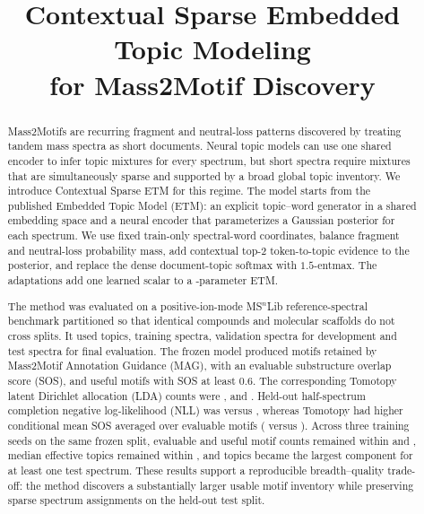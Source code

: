\documentclass[10pt,a4paper]{article}
\title{Contextual Sparse Embedded Topic Modeling\\
for Mass2Motif Discovery}
\author{}
\date{}
\begin{document}
\maketitle
\thispagestyle{titlepage}
\pagestyle{fancy}

\begin{abstract}
Mass2Motifs are recurring fragment and neutral-loss patterns discovered by
treating tandem mass spectra as short documents. Neural topic models can
use one shared encoder to infer topic mixtures for every spectrum, but short
spectra require mixtures that are simultaneously sparse and supported by a
broad global topic inventory. We introduce Contextual Sparse ETM for this
regime. The model starts from the published Embedded Topic Model (ETM): an
explicit topic--word generator in a shared embedding space and a neural encoder
that parameterizes a Gaussian posterior for each spectrum. We use
fixed train-only spectral-word coordinates, balance fragment and neutral-loss
probability mass, add contextual top-2 token-to-topic evidence to the posterior,
and replace the dense document-topic softmax with $1.5$-entmax. The adaptations
add one learned scalar to a
\BaseParameters-parameter ETM.

The method was evaluated on a positive-ion-mode MS$^{n}$Lib reference-spectral
benchmark partitioned so that identical compounds and molecular scaffolds do
not cross splits. It used \StudyTopics{} topics, \TrainingSpectra{} training
spectra, \ValidationSpectra{} validation spectra for development and
\TestSpectra{} test spectra for final evaluation. The frozen model produced
\ContextualOptimized{} motifs retained by Mass2Motif Annotation Guidance (MAG),
\ContextualEvaluable{} with an evaluable substructure overlap score (SOS), and
\ContextualUseful{} useful motifs with SOS at least 0.6. The corresponding
Tomotopy latent Dirichlet allocation (LDA) counts were \TomotopyOptimized{},
\TomotopyEvaluable{} and \TomotopyUseful{}. Held-out half-spectrum completion
negative log-likelihood (NLL) was \ContextualNLL{} versus \TomotopyNLL{}, whereas
Tomotopy had higher conditional mean SOS averaged over evaluable motifs
(\TomotopyMeanSOS{} versus \ContextualMeanSOS{}). Across three training seeds on
the same frozen split, evaluable and useful motif counts remained within
\StabilityEvaluableRange{} and \StabilityUsefulRange{}, median effective topics
remained within \StabilityMedianEffectiveRange{}, and \StabilityUniqueRange{}
topics became the largest component for at least one test spectrum. These results support
a reproducible breadth--quality trade-off: the method discovers a substantially
larger usable motif inventory while preserving sparse spectrum assignments on
the held-out test split.
\end{abstract}
\end{document}
